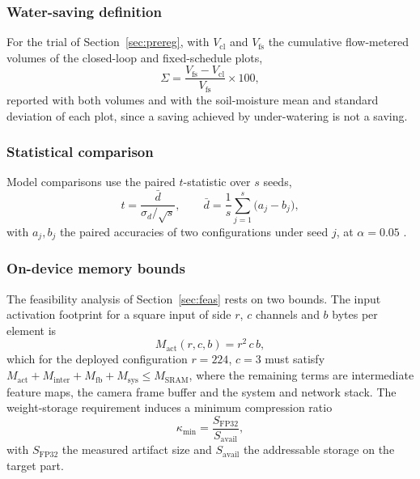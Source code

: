\documentclass[journal]{IEEEtran}
\begin{document}
\subsubsection{Water-saving definition}
For the trial of Section~\ref{sec:prereg}, with $V_{\mathrm{cl}}$ and
$V_{\mathrm{fs}}$ the cumulative flow-metered volumes of the closed-loop
and fixed-schedule plots,
\begin{equation}
\Sigma = \frac{V_{\mathrm{fs}} - V_{\mathrm{cl}}}{V_{\mathrm{fs}}}\times 100,
\label{eq:saving}
\end{equation}
reported with both volumes and with the soil-moisture mean and standard
deviation of each plot, since a saving achieved by under-watering is not a
saving.

\subsubsection{Statistical comparison}
Model comparisons use the paired $t$-statistic over $s$ seeds,
\begin{equation}
t = \frac{\bar{d}}{\sigma_d/\sqrt{s}}, \qquad
\bar{d} = \frac{1}{s}\sum_{j=1}^{s} \big(a_j - b_j\big),
\label{eq:ttest}
\end{equation}
with $a_j,b_j$ the paired accuracies of two configurations under seed $j$,
at $\alpha=0.05$ \cite{demsar2006statistical}.

\subsubsection{On-device memory bounds}
The feasibility analysis of Section~\ref{sec:feas} rests on two bounds. The
input activation footprint for a square input of side $r$, $c$ channels and
$b$ bytes per element is
\begin{equation}
M_{\mathrm{act}}(r,c,b) = r^2\,c\,b,
\label{eq:act}
\end{equation}
which for the deployed configuration $r=224$, $c=3$ must satisfy
$M_{\mathrm{act}} + M_{\mathrm{inter}} + M_{\mathrm{fb}} + M_{\mathrm{sys}}
\le M_{\mathrm{SRAM}}$, where the remaining terms are intermediate feature
maps, the camera frame buffer and the system and network stack. The
weight-storage requirement induces a minimum compression ratio
\begin{equation}
\kappa_{\min} = \frac{S_{\mathrm{FP32}}}{S_{\mathrm{avail}}},
\label{eq:compress}
\end{equation}
with $S_{\mathrm{FP32}}$ the measured artifact size and
$S_{\mathrm{avail}}$ the addressable storage on the target part.
\end{document}
